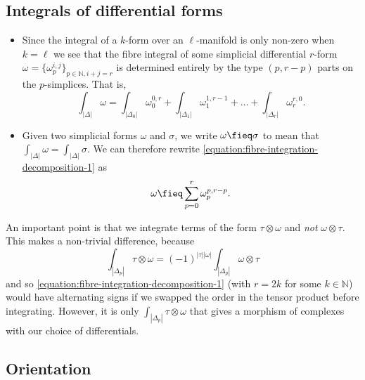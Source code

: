 
    \subsection*{Integrals of differential forms} %
    \label{sub:integrals_of_differential_forms}

        \begin{itemize}
            \item Since the integral of a $k$-form over an $\ell$-manifold is only non-zero when $k=\ell$ we see that the fibre integral of some simplicial differential $r$-form $\omega=\{\omega_p^{i,j}\}_{p\in\mathbb{N},i+j=r}$ is determined entirely by the type $(p,r-p)$ parts on the $p$-simplices.
                That is,
                \begin{equation}\label{equation:fibre-integration-decomposition-1}
                    \int_{|\Delta|}\omega = \int_{|\Delta_0|}\omega^{0,r}_0+\int_{|\Delta_1|}\omega^{1,r-1}_1+\ldots+\int_{|\Delta_r|}\omega^{r,0}_r.
                \end{equation}
            \item Given two simplicial forms $\omega$ and $\sigma$, we write $\omega\fieq\sigma$ to mean that $\int_{|\Delta|}\omega=\int_{|\Delta|}\sigma$.
                We can therefore rewrite \cref{equation:fibre-integration-decomposition-1} as
                \begin{equation}
                    \omega \fieq \sum_{p=0}^r\omega^{p,r-p}_p.
                \end{equation}
        \end{itemize}

        An important point is that we integrate terms of the form $\tau\otimes\omega$ and \emph{not} $\omega\otimes\tau$.
        This makes a non-trivial difference, because
        \[
            \int_{|\Delta_p|}\tau\otimes\omega = (-1)^{|\tau||\omega|}\int_{|\Delta_p|}\omega\otimes\tau
        \]
        and so \cref{equation:fibre-integration-decomposition-1} (with $r=2k$ for some $k\in\mathbb{N}$) would have alternating signs if we swapped the order in the tensor product before integrating.
        However, it is only $\int_{|\Delta_p|}\tau\otimes\omega$ that gives a morphism of complexes with our choice of differentials.

    
    \subsection*{Orientation} %
    \label{sub:orientation}

